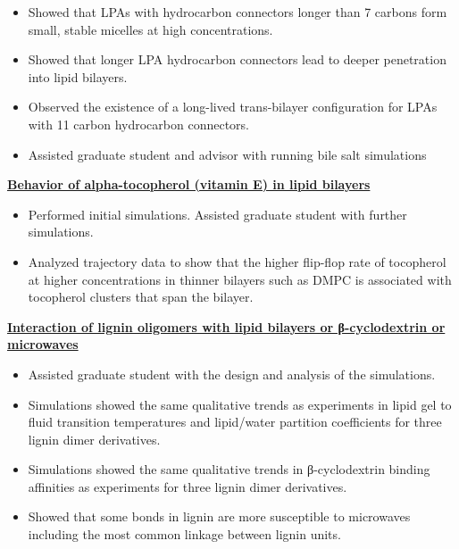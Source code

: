 \begin{cventries}
{\begin{cvitems}
                \vspace{2pt}
                \begin{itemize}
                \item {Showed that LPAs with hydrocarbon connectors longer than 7 carbons form small, stable micelles at high concentrations.}
                \item {Showed that longer LPA hydrocarbon connectors lead to deeper penetration into lipid bilayers.}
                \item {Observed the existence of a long-lived trans-bilayer configuration for LPAs with 11 carbon hydrocarbon connectors.}
                \item {Assisted graduate student and advisor with running bile salt simulations}
                \end{itemize}
            \item {\textbf{\underline{Behavior of alpha-tocopherol (vitamin E) in lipid bilayers}}}
                \vspace{2pt}
                \begin{itemize}
                \item {Performed initial simulations. Assisted graduate student with further simulations.}
                \item {Analyzed trajectory data to show that the higher flip-flop rate of tocopherol at higher concentrations in thinner bilayers such as DMPC is associated with tocopherol clusters that span the bilayer.}
                \end{itemize}
            \item {\textbf{\underline{Interaction of lignin oligomers with lipid bilayers or β-cyclodextrin or microwaves}}}
                \vspace{2pt}
                \begin{itemize}
                    \item {Assisted graduate student with the design and analysis of the simulations.}
                    \item {Simulations showed the same qualitative trends as experiments in lipid gel to fluid transition temperatures and lipid/water partition coefficients for three lignin dimer derivatives.}
                    \item {Simulations showed the same qualitative trends in β-cyclodextrin binding affinities as experiments for three lignin dimer derivatives.}
                    \item {Showed that some bonds in lignin are more susceptible to microwaves including the most common linkage between lignin units.}

\end{itemize}
\end{cvitems}}
\end{cventries}
